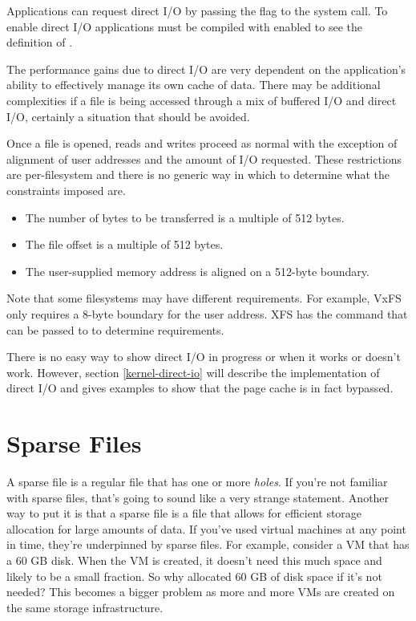 \noindent
Applications can request direct I/O by passing the  flag to the  system call. To enable direct I/O applications must be compiled with  enabled to see the definition of .

The performance gains due to direct I/O are very dependent on the application's ability to effectively manage its own cache of data. There may be additional complexities if a file is being accessed through a mix of buffered I/O and direct I/O, certainly a situation that should be avoided.

Once a file is opened, reads and writes proceed as normal with the exception of alignment of user addresses and the amount of I/O requested. These restrictions are per-filesystem and there is no generic way in which to determine what the constraints imposed are.

\begin{itemize}
	\item The number of bytes to be transferred is a multiple of 512 bytes.
	\item The file offset is a multiple of 512 bytes.
	\item The user-supplied memory address is aligned on a 512-byte boundary.
\end{itemize}

\noindent
Note that some filesystems may have different requirements. For example, VxFS only requires a 8-byte boundary for the user address. XFS has the  command that can be passed to  to determine requirements.

There is no easy way to show direct I/O in progress or when it works or doesn't work. However, section \ref{kernel-direct-io} will describe the implementation of direct I/O and gives examples to show that the page cache is in fact bypassed.


\section{Sparse Files}

A sparse file is a regular file that has one or more \textit{holes}. If you're not familiar with sparse files, that's going to sound like a very strange statement. Another way to put it is that a sparse file is a file that allows for efficient storage allocation for large amounts of data. If you've used virtual machines at any point in time, they're underpinned by sparse files. For example, consider a VM that has a 60 GB disk. When the VM is created, it doesn't need this much space and likely to be a small fraction. So why allocated 60 GB of disk space if it's not needed? This becomes a bigger problem as more and more VMs are created on the same storage infrastructure.

